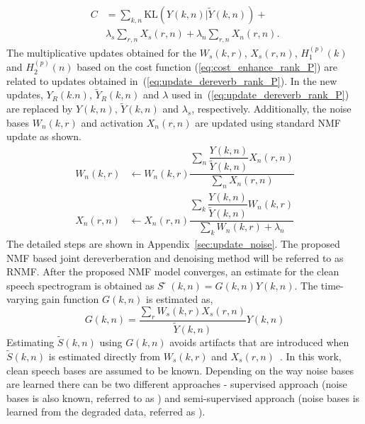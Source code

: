\begin{align}
C &= \sum_{k,n}\text{KL}(Y(k,n)|\tilde{Y}(k,n)) + \nonumber \\
& \lambda_s \sum_{r,n} X_s(r,n) + \lambda_n \sum_{r,n} X_n(r,n).
\label{eq:cost_enhance_rank_P}
\end{align}
The multiplicative updates obtained for the $W_s(k,r)$, $X_s(r,n)$, $H_1^{(p)}(k)$ and $H_2^{(p)}(n)$ based on the cost function (\ref{eq:cost_enhance_rank_P}) are related to updates obtained in~(\ref{eq:update_dereverb_rank_P}). In the new updates, $Y_R(k.n)$, $\tilde{Y}_R(k,n)$ and $\lambda$ used in~(\ref{eq:update_dereverb_rank_P}) are replaced by $Y(k,n)$, $\tilde{Y}(k,n)$ and $\lambda_s$, respectively. Additionally, the noise bases $W_n(k,r)$ and activation $X_n(r,n)$ are updated using standard NMF update as shown. 
\begin{align}
W_n(k,r) & \leftarrow W_n(k,r)\dfrac{\sum_n \dfrac{Y(k,n)}{\tilde{Y}(k,n)}X_n(r,n)}{\sum_nX_n(r,n)} \nonumber \\
X_n(r,n) &\leftarrow X_n(r,n) \dfrac{\sum_k \dfrac{Y(k,n)}{\tilde{Y}(k,n)}W_n(k,r)}{\sum_k W_n(k,r) + \lambda_n}
\label{eq:update_enhance_rank_P}
\end{align}
The detailed steps are shown in Appendix~\ref{sec:update_noise}. The proposed
NMF based joint dereverberation and denoising method will be referred to as RNMF. After the proposed NMF model converges, an estimate for the clean speech spectrogram is
obtained as $S̃(k,n)=G(k,n)Y(k,n)$. The time-varying gain function $G(k,n)$ is estimated as,
\begin{equation}
G(k,n)=\dfrac{\sum_r W_s(k,r)X_s(r,n)}{\tilde{Y}(k,n)}Y(k,n)
\label{eq:gain_function}
\end{equation}
Estimating $\tilde{S}(k,n)$ using $G(k,n)$ avoids artifacts that are introduced when $\tilde{S}(k,n)$ is estimated directly from $W_s(k,r)$ and $X_s(r,n)$~\cite{mohammadiha2016speech}. In this work, clean speech bases are assumed to be known. Depending on the way noise bases are learned there can be two different approaches - supervised approach (noise bases is also known, referred to as ) and semi-supervised approach (noise bases is learned from the degraded data, referred as ).
\fi
